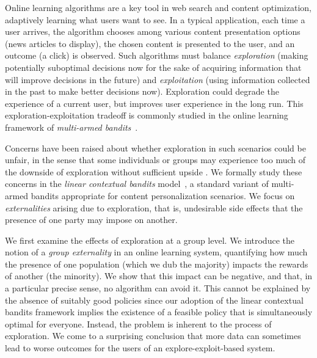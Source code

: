 Online learning algorithms are a key tool in web search and content optimization, adaptively learning what users want to see. In a typical application, each time a user arrives, the algorithm chooses among various content presentation options (\eg news articles to display), the chosen content is presented to the user, and an outcome (\eg a click) is observed. Such algorithms must balance \emph{exploration} (making potentially suboptimal decisions now for the sake of acquiring information that will improve decisions in the future) and \emph{exploitation} (using information collected in the past to make better decisions now). Exploration could degrade the experience of a current user, but improves user experience in the long run. This exploration-exploitation tradeoff is commonly studied in the online learning framework of \emph{multi-armed bandits}~\citep{Bubeck-survey12}.

Concerns have been raised about whether exploration in such scenarios could be unfair, in the sense that some individuals or groups may experience too much of the downside of exploration without sufficient upside \citep{bird2016exploring}. We formally study these concerns in the \emph{linear contextual bandits} model~\citep{Langford-www10,chu2011contextual}, a standard variant of multi-armed bandits appropriate for content personalization scenarios.  We focus on \emph{externalities} arising due to exploration, that is, undesirable side effects that the presence of one party may impose on another.


We first examine the effects of exploration at a group level.  We introduce the notion of a \emph{group externality} in an online learning system, quantifying how much the presence of one population (which we dub the majority) impacts the rewards of another (the minority). We show that this impact can be negative, and that, in a particular precise sense, no algorithm can avoid it. This cannot be explained by the absence of suitably good policies since our adoption of the linear contextual bandits framework implies the existence of a feasible policy that is simultaneously optimal for everyone. Instead, the problem is inherent to the process of exploration. We come to a surprising conclusion that more data can sometimes lead to worse outcomes for the users of an explore-exploit-based system. 


